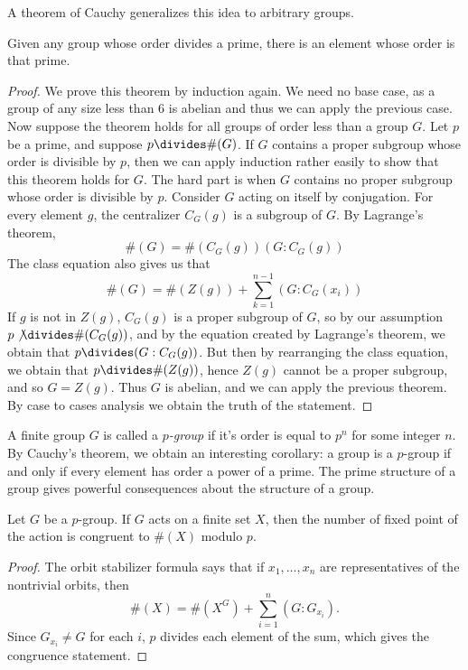 A theorem of Cauchy generalizes this idea to arbitrary groups.

\begin{theorem} 
    Given any group whose order divides a prime, there is an element whose order is that prime.
\end{theorem}
\begin{proof}
    We prove this theorem by induction again. We need no base case, as a group of any size less than 6 is abelian and thus we can apply the previous case. Now suppose the theorem holds for all groups of order less than a group $G$. Let $p$ be a prime, and suppose $p \divides \#(G)$. If $G$ contains a proper subgroup whose order is divisible by $p$, then we can apply induction rather easily to show that this theorem holds for $G$. The hard part is when $G$ contains no proper subgroup whose order is divisible by $p$. Consider $G$ acting on itself by conjugation. For every element $g$, the centralizer $C_G(g)$ is a subgroup of $G$. By Lagrange's theorem,
    \[ \#(G) = \#(C_G(g))(G:C_G(g)) \]
    The class equation also gives us that
    \[ \#(G) = \#(Z(g)) + \sum_{k = 1}^{n-1} (G:C_G(x_i)) \]
    If $g$ is not in $Z(g)$, $C_G(g)$ is a proper subgroup of $G$, so by our assumption $p \not \divides \#(C_G(g))$, and by the equation created by Lagrange's theorem, we obtain that $p \divides (G:C_G(g))$. But then by rearranging the class equation, we obtain that $p \divides \#(Z(g))$, hence $Z(g)$ cannot be a proper subgroup, and so $G = Z(g)$. Thus $G$ is abelian, and we can apply the previous theorem. By case to cases analysis we obtain the truth of the statement.
\end{proof}

A finite group $G$ is called a \emph{$p$-group} if it's order is equal to $p^n$ for some integer $n$. By Cauchy's theorem, we obtain an interesting corollary: a group is a $p$-group if and only if every element has order a power of a prime. The prime structure of a group gives powerful consequences about the structure of a group.

\begin{lemma}
    Let $G$ be a $p$-group. If $G$ acts on a finite set $X$, then the number of fixed point of the action is congruent to $\#(X)$ modulo $p$.
\end{lemma}
\begin{proof}
    The orbit stabilizer formula says that if $x_1,\dots,x_n$ are representatives of the nontrivial orbits, then
    \[ \#(X) = \#(X^G) + \sum_{i = 1}^n (G:G_{x_i}). \]
    Since $G_{x_i} \neq G$ for each $i$, $p$ divides each element of the sum, which gives the congruence statement.
\end{proof}

